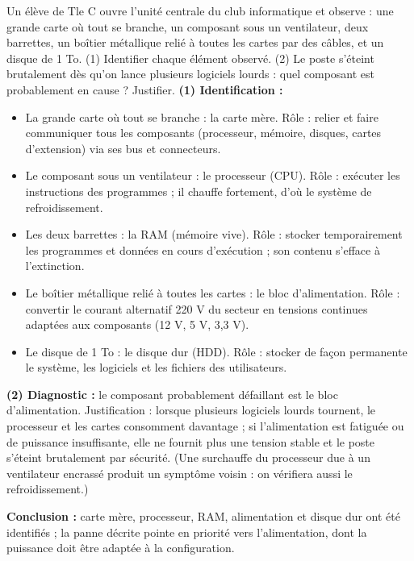 \documentclass[11pt]{article}
\newcommand{\cle}[1]{{\popxbold\color{popdark}#1}}
\begin{document}
\begin{exoresolu}
Un élève de Tle C ouvre l'unité centrale du club informatique et observe : une grande carte où tout se branche, un composant sous un ventilateur, deux barrettes, un boîtier métallique relié à toutes les cartes par des câbles, et un disque de 1 To. (1) Identifier chaque élément observé. (2) Le poste s'éteint brutalement dès qu'on lance plusieurs logiciels lourds : quel composant est probablement en cause ? Justifier.
\tcblower
\textbf{(1) Identification :}
\begin{itemize}
\item La grande carte où tout se branche : la \cle{carte mère}. Rôle : relier et faire communiquer tous les composants (processeur, mémoire, disques, cartes d'extension) via ses bus et connecteurs.
\item Le composant sous un ventilateur : le \cle{processeur} (CPU). Rôle : exécuter les instructions des programmes ; il chauffe fortement, d'où le système de refroidissement.
\item Les deux barrettes : la \cle{RAM} (mémoire vive). Rôle : stocker temporairement les programmes et données en cours d'exécution ; son contenu s'efface à l'extinction.
\item Le boîtier métallique relié à toutes les cartes : le \cle{bloc d'alimentation}. Rôle : convertir le courant alternatif 220 V du secteur en tensions continues adaptées aux composants (12 V, 5 V, 3,3 V).
\item Le disque de 1 To : le \cle{disque dur} (HDD). Rôle : stocker de façon permanente le système, les logiciels et les fichiers des utilisateurs.
\end{itemize}

\textbf{(2) Diagnostic :} le composant probablement défaillant est le \cle{bloc d'alimentation}. Justification : lorsque plusieurs logiciels lourds tournent, le processeur et les cartes consomment davantage ; si l'alimentation est fatiguée ou de puissance insuffisante, elle ne fournit plus une tension stable et le poste s'éteint brutalement par sécurité. (Une surchauffe du processeur due à un ventilateur encrassé produit un symptôme voisin : on vérifiera aussi le refroidissement.)

\textbf{Conclusion :} carte mère, processeur, RAM, alimentation et disque dur ont été identifiés ; la panne décrite pointe en priorité vers l'alimentation, dont la puissance doit être adaptée à la configuration.
\end{exoresolu}
\end{document}
